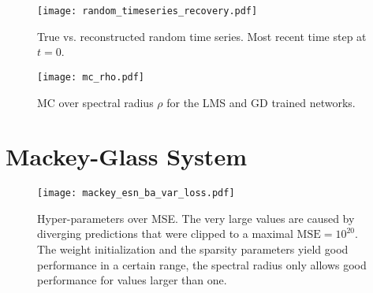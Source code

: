 \begin{figure}
  \begin{minipage}[t]{.48\textwidth}
    \texttt{[image: random\_timeseries\_recovery.pdf]}
    \caption{
      True vs. reconstructed random time series. Most recent time step at $t=0$.
    }
    \label{fig:random_timeseries_recovery}
  \end{minipage}
  \hspace{.02\textwidth}
  \begin{minipage}[t]{.48\textwidth}
    \texttt{[image: mc\_rho.pdf]}
    \caption{MC over spectral radius $\rho$ for the LMS and GD trained networks.}
    \label{fig:mc_rho}
  \end{minipage}
\end{figure}



\newpage
\section{Mackey-Glass System}%
\label{sec:res_mackey_glass_system}

\begin{figure}
  \centering
  \texttt{[image: mackey\_esn\_ba\_var\_loss.pdf]}
  \caption{Hyper-parameters over MSE. The very large
    values are caused by diverging predictions that were clipped to a maximal
    $\mathrm{MSE}=10^{20}$. The weight initialization and the sparsity
    parameters yield good performance in a certain range, the spectral radius
  only allows good performance for values larger than one.}
  \label{fig:mackey_esn_ba_var_loss}
\end{figure}


